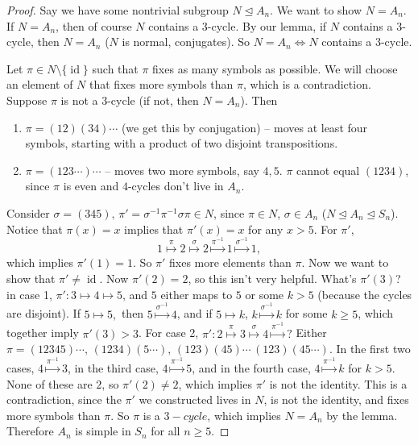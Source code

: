 \begin{proof}
    Say we have some nontrivial subgroup $N \trianglelefteq A_n$. We want to show $N=A_n$. If $N=A_n$, then of course $N$ contains a $3$-cycle. By our lemma, if $N$ contains a $3$-cycle, then $N=A_n$ ($N$ is normal, conjugates). So $N=A_n\iff N$ contains a $3$-cycle.

    Let $\pi\in N\setminus \{\operatorname{id}\} $ such that $\pi$ fixes as many symbols as possible. We will choose an element of $N$ that fixes more symbols than $\pi$, which is a contradiction. Suppose $\pi$ is not a $3$-cycle (if not, then $N=A_n$). Then 
    \begin{enumerate}
        \item $\pi=(12)(34)\cdots$ (we get this by conjugation) – moves at least four symbols, starting with a product of two disjoint transpositions.
        \item $\pi=(123\cdots)\cdots$ – moves two more symbols, say $4,5$. $\pi$ cannot equal $(1234)$, since $\pi$ is even and $4$-cycles don't live in $A_n$.
    \end{enumerate}
    Consider $\sigma=(345),\, \pi'=\sigma^{-1}\pi^{-1}\sigma\pi\in N$, since $\pi\in N$, $\sigma\in A_n$ ($N\trianglelefteq A_n\trianglelefteq S_n$). Notice that $\pi(x)=x$ implies that $\pi'(x)=x$ for any $x>5$. For $\pi'$, 
    \[
    1\overset{\pi}{\mapsto }2\overset{\sigma}{\mapsto }2\overset{\pi^{-1}}{\mapsto }1\overset{\sigma^{-1}}{\mapsto }1,
    \] 
    which implies $\pi'(1)=1$. So $\pi'$ fixes more elements than $\pi$. Now we want to show that $\pi'\neq \operatorname{id}$. Now $\pi'(2)=2$, so this isn't very helpful. What's $\pi'(3)$? in case 1, $\pi' \colon 3 \mapsto 4 \mapsto 5$, and $5$ either maps to $5$ or some $k>5$ (because the cycles are disjoint). If $5\mapsto 5,$ then $5\overset{\sigma^{-1}}{\mapsto }4$, and if $5\mapsto k$, $k\overset{\sigma^{-1}}{\mapsto } k$ for some $k\geq 5$, which together imply $\pi'(3)>3$. For case 2, $\pi' \colon 2 \overset{\pi}{\mapsto }3 \overset{\sigma}{\mapsto }4 \overset{\pi^{-1}}{\mapsto }?$ Either $\pi=(12345)\cdots,\,(1234)(5\cdots),\,(123)(45)\cdots\,(123)(45\cdots)$. In the first two cases, $4\overset{\pi^{-1}}{\mapsto }3$, in the third case, $4\overset{\pi^{-1}}{\mapsto }5$, and in the fourth case, $4 \overset{\pi^{-1}}{\mapsto }k$ for $k>5$. None of these are $2$, so $\pi'(2)\neq 2$, which implies $\pi'$ is not the identity. This is a contradiction, since the $\pi'$ we constructed lives in $N$, is not the identity, and fixes more symbols than $\pi$. So $\pi$ is a $3-cycle$, which implies $N=A_n$ by the lemma. Therefore $A_n$ is simple in $S_n$ for all $n\geq 5$.
\end{proof}



